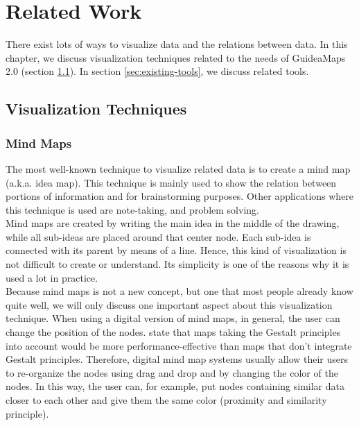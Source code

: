 \chapter{Related Work}\label{ch:related-work}

There exist lots of ways to visualize data and the relations between data. In this chapter, we discuss visualization techniques related to the needs of GuideaMaps 2.0 (section \ref{sec:visualization-techniques}). In section \ref{sec:existing-tools}, we discuss related tools.


\section{Visualization Techniques}\label{sec:visualization-techniques}

\subsection{Mind Maps}\label{sec:mind-maps}
The most well-known technique to visualize related data is to create a mind map (a.k.a. idea map). This technique is mainly used to show the relation between portions of information and for brainstorming purposes. Other applications where this technique is used are note-taking, and problem solving. \citep{knowledgemapsbalaid} \\

Mind maps are created by writing the main idea in the middle of the drawing, while all sub-ideas are placed around that center node. Each sub-idea is connected with its parent by means of a line. Hence, this kind of visualization is not difficult to create or understand. Its simplicity is one of the reasons why it is used a lot in practice.\\

Because mind maps is not a new concept, but one that most people already know quite well, we will only discuss one important aspect about this visualization technique. When using a digital version of mind maps, in general, the user can change the position of the nodes. \cite{wiegmann-1992} state that maps taking the Gestalt principles \citep{koffka2013principles} into account would be more performance-effective than maps that don't integrate Gestalt principles. Therefore, digital mind map systems usually allow their users to re-organize the nodes using drag and drop and by changing the color of the nodes. In this way, the user can, for example, put nodes containing similar data closer to each other and give them the same color (proximity and similarity principle).



